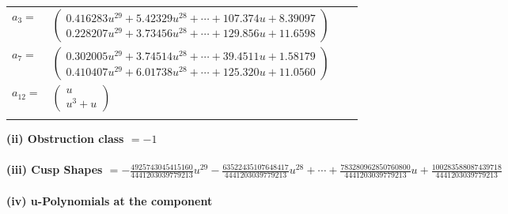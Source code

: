 \documentclass[1p]{elsarticle_modified}
\theoremstyle{definition}
\begin{document}
\begin{tabular}{m{7pt} m{180pt} m{7pt} m{180pt} }
\flushright $a_{3}=$&$\begin{pmatrix}0.416283 u^{29}+5.42329 u^{28}+\cdots+107.374 u+8.39097\\0.228207 u^{29}+3.73456 u^{28}+\cdots+129.856 u+11.6598\end{pmatrix}$ \\
\flushright $a_{7}=$&$\begin{pmatrix}0.302005 u^{29}+3.74514 u^{28}+\cdots+39.4511 u+1.58179\\0.410407 u^{29}+6.01738 u^{28}+\cdots+125.320 u+11.0560\end{pmatrix}$ \\
\flushright $a_{12}=$&$\begin{pmatrix}u\\u^3+u\end{pmatrix}$\\&\end{tabular}
\flushleft \textbf{(ii) Obstruction class $= -1$}\\~\\
\flushleft \textbf{(iii) Cusp Shapes $= -\frac{4925743045415160}{4441203039779213} u^{29}-\frac{63522435107648417}{4441203039779213} u^{28}+\cdots+\frac{783280962850760800}{4441203039779213} u+\frac{100283588087439718}{4441203039779213}$}\\~\\
\newpage\renewcommand{\arraystretch}{1}
\flushleft \textbf{(iv) u-Polynomials at the component}\newline \\
\end{document}

